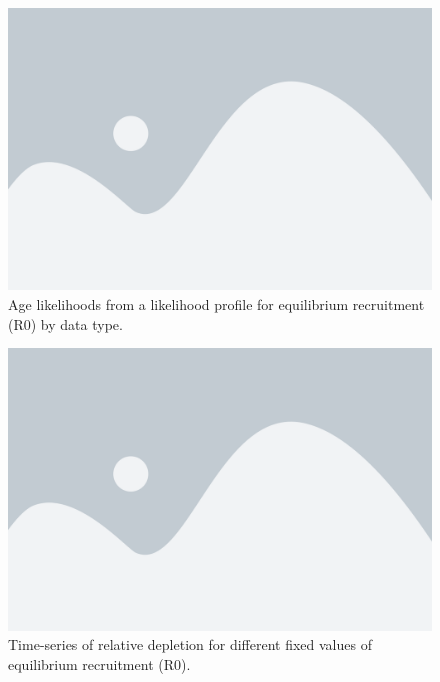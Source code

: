 \documentclass[11pt,
  english,
  a4paper,
]{article}
\begin{document}
\tagmcend\tagstructend


\begin{figure}
\centering
\includegraphics[width=1\textwidth,height=1\textheight]{figs/placeholder.png}
\caption{Age likelihoods from a likelihood profile for equilibrium recruitment (R0) by data type.\label{fig:sens_R0_ssb}}
\end{figure}

\tagmcend\tagstructend


\begin{figure}
\centering
\includegraphics[width=1\textwidth,height=1\textheight]{figs/placeholder.png}
\caption{Time-series of relative depletion for different fixed values of equilibrium recruitment (R0).\label{fig:sens_R0_depl}}
\end{figure}
\end{document}
